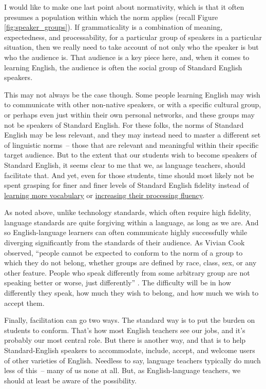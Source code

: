 I would like to make one last point about normativity, which is that it often presumes a population within which the norm applies (recall Figure \ref{fig:speaker_groups}). If grammaticality is a combination of meaning, expectedness, and processability, for a particular group of speakers in a particular situation, then we really need to take account of not only who the speaker is but who the audience is. That audience is a key piece here, and, when it comes to learning English, the audience is often the social group of Standard English speakers.

This may not always be the case though. Some people learning English may wish to communicate with other non-native speakers, or with a specific cultural group, or perhaps even just within their own personal networks, and these groups may not be speakers of Standard English. For these folks, the norms of Standard English may be less relevant, and they may instead need to master a different set of linguistic norms~-- those that are relevant and meaningful within their specific target audience. But to the extent that our students wish to become speakers of Standard English, it seems clear to me that we, as language teachers, should facilitate that. And yet, even for those students, time should most likely not be spent grasping for finer and finer levels of Standard English fidelity instead of \hyperref[ch:vocabulary]{learning more vocabulary} or \hyperref[ch:fluency]{increasing their processing fluency}. 

As noted above, unlike technology standards, which often require high fidelity, language standards are quite forgiving within a language, as long as we are. And so English-language learners can often communicate highly successfully while diverging significantly from the standards of their audience. As Vivian Cook observed, ``people cannot be expected to conform to the norm of a group to which they do not belong, whether groups are defined by race, class, sex, or any other feature. People who speak differently from some arbitrary group are not speaking better or worse, just differently'' \citep[194]{Cook1999}. The difficulty will be in how differently they speak, how much they wish to belong, and how much we wish to accept them.

Finally, facilitation can go two ways. The standard way is to put the burden on students to conform. That's how most English teachers see our jobs, and it's probably our most central role. But there is another way, and that is to help Standard-English speakers to accommodate, include, accept, and welcome users of other varieties of English. Needless to say, language teachers typically do much less of this~-- many of us none at all. But, as English-language teachers, we should at least be aware of the possibility.

